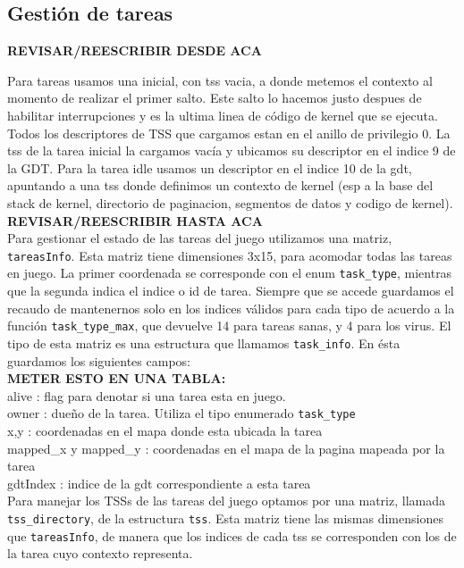 \subsection{Gestión de tareas}

\textbf{REVISAR/REESCRIBIR DESDE ACA}

Para tareas usamos una inicial, con tss vacia, a donde metemos el contexto al momento de realizar el primer salto. Este salto lo hacemos justo despues de habilitar interrupciones y es la ultima linea de código de kernel que se ejecuta.\\

Todos los descriptores de TSS que cargamos estan en el anillo de privilegio 0.
La tss de la tarea inicial la cargamos vacía y ubicamos su descriptor en el indice 9 de la GDT.
Para la tarea idle usamos un descriptor en el indice 10 de la gdt, apuntando a una tss donde definimos un contexto de kernel (esp a la base del stack de kernel, directorio de paginacion, segmentos de datos y codigo de kernel).\\
\textbf{REVISAR/REESCRIBIR HASTA ACA}\\


Para gestionar el estado de las tareas del juego utilizamos una matriz, \verb|tareasInfo|. Esta matriz tiene dimensiones 3x15, para acomodar todas las tareas en juego. La primer coordenada se corresponde con el enum \verb|task_type|, mientras que la segunda indica el indice o id de tarea. Siempre que se accede guardamos el recaudo de mantenernos solo en los indices válidos para cada tipo de acuerdo a la función \verb|task_type_max|, que devuelve 14 para tareas sanas, y 4 para los virus.
El tipo de esta matriz es una estructura que llamamos \verb|task_info|.
En ésta guardamos los siguientes campos:\\

\textbf{METER ESTO EN UNA TABLA:}\\
alive : flag para denotar si una tarea esta en juego. \\
owner : dueño de la tarea. Utiliza el tipo enumerado \verb|task_type|\\
x,y   : coordenadas en el mapa donde esta ubicada la tarea\\
mapped\_x y mapped\_y : coordenadas en el mapa de la pagina mapeada por la tarea\\
gdtIndex : indice de la gdt correspondiente a esta tarea\\

Para manejar los TSSs de las tareas del juego optamos por una matriz, llamada \verb|tss_directory|, de la estructura \verb|tss|. Esta matriz tiene las mismas dimensiones que \verb|tareasInfo|, de manera que los indices de cada tss se corresponden con los de la tarea cuyo contexto representa. 
\\

